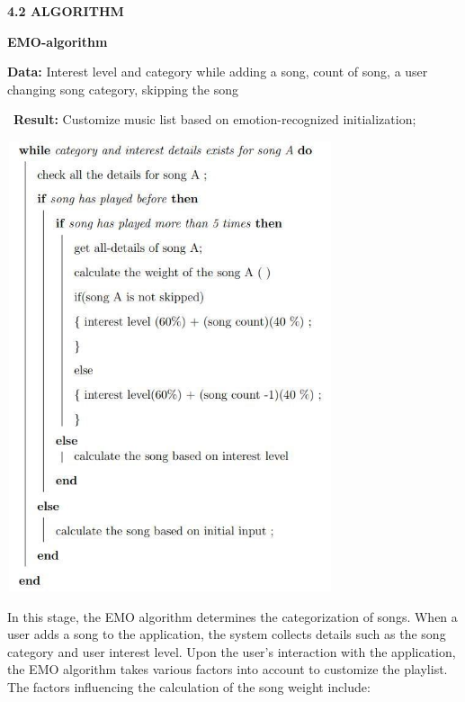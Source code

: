 \documentclass[a4paper]{article}
\begin{document}
\bigskip

{\bfseries
\hypertarget{z337ya}{}4.2 ALGORITHM }


\bigskip

\textbf{EMO-algorithm}


\bigskip

\textbf{Data:} Interest level and category while adding a song, count of song, a user changing song category, skipping
the song 

\ \textbf{Result:} Customize music list based on emotion-recognized initialization; 

\begin{center}
\includegraphics[width=3.7709in,height=5.2083in]{rahulop-img007.jpg}
\end{center}

\bigskip

{\par}

\bigskip

In this stage, the EMO algorithm determines the categorization of songs. When a user adds a song to the application, the
system collects details such as the song category and user interest level. Upon the user's interaction with the
application, the EMO algorithm takes various factors into account to customize the playlist. The factors influencing
the calculation of the song weight include:
\end{document}
